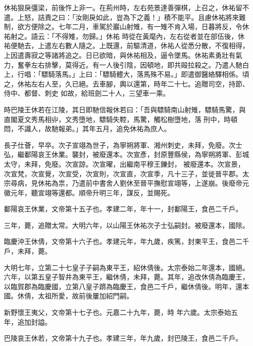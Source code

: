 \begin{pinyinscope}
 休祐狠戾彊梁，前後忤上非一。在荊州時，左右苑景達善彈棋，上召之，休祐留不遣。上怒，詰責之曰：「汝剛戾如此，豈為下之義！」積不能平。且慮休祐將來難制，欲方便除之。七年二月，車駕於巖山射雉，有一雉不肯入場，日暮將反，令休祐射之。語云：「不得雉，勿歸。」休祐
 時從在黃麾內，左右從者並在部伍後，休祐便馳去，上遣左右數人隨之。上既還，前驅清道，休祐人從悉分散，不復相得，上因遣壽寂之等諸將追之。日已欲暗，與休祐相及，逼令墜馬。休祐素勇壯有氣力，奮拳左右排擊，莫得近。有一人後引陰，因頓地，即共毆拉殺之。乃遣人馳白上，行唱：「驃騎落馬。」上曰：「驃騎體大，落馬殊不易。」即遣御醫絡驛相係。頃之，休祐左右人至，久已絕。去車腳，輿以還第，時年二十七。追贈司空，持節、侍中、都督、刺史
 如故，給班劍二十人，三望車一乘。



 時巴陵王休若在江陵，其日即馳信報休若曰：「吾與驃騎南山射雉，驃騎馬驚，與直閣夏文秀馬相丱，文秀墮地，驃騎失鞚，馬驚，觸松樹墮地，落刑中，時頓悶，不識人，故馳報弟。」其年五月，追免休祐為庶人。



 長子仕薈，早卒。次子宣翊為世子，為寧朔將軍、湘州刺史，未拜，免廢。次士弘，繼鄱陽哀王休業。襲封，被廢還本。次宣彥，封原豐縣侯，為寧朔將軍、彭城太守，未拜，免廢。次宣諒。次宣曜，出繼南平穆王鑠封，
 被廢還本。次宣景，次宣梵，次宣覺，次宣受，次宣則，次宣直，次宣季，凡十三子，並徙晉平郡。太宗尋病，見休祐為祟，乃遣前中書舍人劉休至晉平撫慰宣翊等，上遂崩。後廢帝元徽元年，聽宣翊等還都。順帝升明三年，謀反，並賜死。



 鄱陽哀王休業，文帝第十五子也。孝建二年，年十一，封鄱陽王，食邑二千戶。



 三年，薨，追贈太常。大明六年，以山陽王休祐次子士弘嗣封。被廢還本，國除。



 臨慶沖王休倩，文帝第十六子也。孝建元年，年九歲，疾篤，封東平王，食邑二千戶，未拜，薨。



 大明七年，立第二十七皇子子嗣為東平王，紹休倩後。太宗泰始二年還本，國絕。六年，以第五皇子智井為東平王，繼休倩，未拜，薨。其年，追改休倩為臨慶王，以臨賀郡為臨慶國，立第八皇子躋為臨慶王，食邑二千戶，繼休倩後。明年，還本國。休倩，太祖所愛，故前後屢加紹門嗣。



 新野懷王夷父，文帝第十七子也。元嘉二十九年，薨，時
 年六歲。太宗泰始五年，追加封謚。



 巴陵哀王休若，文帝第十九子也。孝建三年，年九歲，封巴陵王，食邑二千戶。




\end{pinyinscope}
